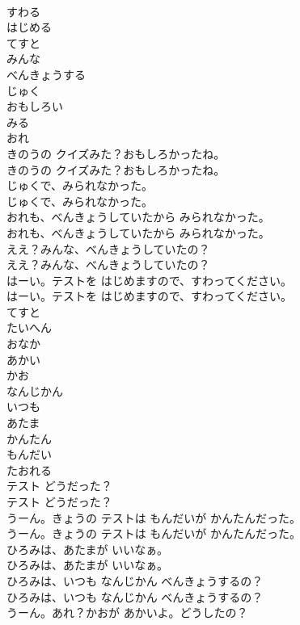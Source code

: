 \documentclass[8pt]{extreport}
\begin{document}
\begin{CJK}{UTF8}{min}
\\	すわる
\\	はじめる
\\	てすと
\\	みんな
\\	べんきょうする
\\	じゅく
\\	おもしろい
\\	みる
\\	おれ
\\	きのうの クイズみた？おもしろかったね。	
\\	きのうの クイズみた？おもしろかったね。 
\\	じゅくで、みられなかった。	
\\	じゅくで、みられなかった。 
\\	おれも、べんきょうしていたから みられなかった。	
\\	おれも、べんきょうしていたから みられなかった。 
\\	ええ？みんな、べんきょうしていたの？	
\\	ええ？みんな、べんきょうしていたの？ 
\\	はーい。テストを はじめますので、すわってください。	
\\	はーい。テストを はじめますので、すわってください。 
\\	てすと
\\	たいへん
\\	おなか
\\	あかい
\\	かお
\\	なんじかん
\\	いつも
\\	あたま
\\	かんたん
\\	もんだい
\\	たおれる
\\	テスト どうだった？	
\\	テスト どうだった？ 
\\	うーん。きょうの テストは もんだいが かんたんだった。	
\\	うーん。きょうの テストは もんだいが かんたんだった。 
\\	ひろみは、あたまが いいなぁ。	
\\	ひろみは、あたまが いいなぁ。 
\\	ひろみは、いつも なんじかん べんきょうするの？	
\\	ひろみは、いつも なんじかん べんきょうするの？ 
\\	うーん。あれ？かおが あかいよ。どうしたの？	

\end{CJK}
\end{document}
